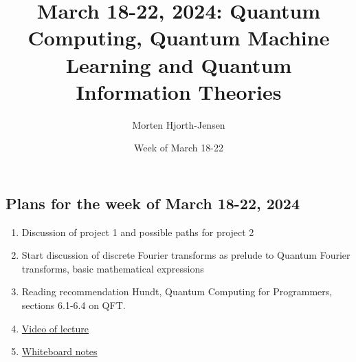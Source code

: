 \documentclass[%
oneside,                 %
final,                   %
10pt]{article}
\begin{document}

\newcommand{\exercisesection}[1]{\subsection*{#1}}






\title{March 18-22, 2024: Quantum Computing, Quantum Machine Learning and Quantum Information Theories}


\author{Morten Hjorth-Jensen}

\date{Week of March 18-22
}

\subsection{Plans for the week of March 18-22, 2024}

\begin{block}{}
\begin{enumerate}
\item Discussion of project 1 and possible paths for project 2

\item Start discussion of discrete Fourier transforms as prelude to Quantum Fourier transforms, basic mathematical expressions

\item Reading recommendation Hundt, Quantum Computing for Programmers, sections 6.1-6.4 on QFT.

\item \href{{https://youtu.be/kR-4qqtFyxQ}}{Video of lecture}

\item \href{{https://github.com/CompPhysics/QuantumComputingMachineLearning/blob/gh-pages/doc/HandWrittenNotes/2024/NotesMarch20.pdf}}{Whiteboard notes}
\end{enumerate}

\noindent
\end{block}
\end{document}
